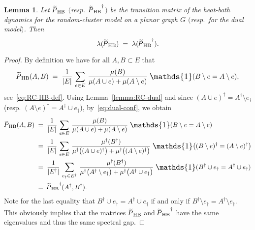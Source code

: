 \documentclass{dis}
\newtheorem{lemma}[theorem]{Lemma}
\theoremstyle{citing}
\begin{document}
\begin{lemma} \label{lemma:RC-HB-dual}
Let ${{\raisebox{2pt}{ ${\widetilde{{}}}$ }\mkern-14mu P}_{\rm HB}}$ $($resp.~${{\raisebox{2pt}{ ${\widetilde{{}}}$ }\mkern-14mu P}_{\rm HB}}^\dag$$)$ be the transition matrix of the 
heat-bath dynamics for the random-cluster model 
on a planar graph $G$ $($resp.~for the dual model\/$)$.
Then
\[
\lambda({{\raisebox{2pt}{ ${\widetilde{{}}}$ }\mkern-14mu P}_{\rm HB}}) \;=\; \lambda({{\raisebox{2pt}{ ${\widetilde{{}}}$ }\mkern-14mu P}_{\rm HB}}^\dag).
\]
\end{lemma}
\vspace{2mm}

\begin{proof}
By definition we have for all $A,B\subset E$ that 
\[
{{\raisebox{2pt}{ ${\widetilde{{}}}$ }\mkern-14mu P}_{\rm HB}}(A,B) \;=\; \frac1{{\left\vert {E} \right\vert}}\,\sum_{e\in E}\,
\frac{\mu(B)}{\mu(A\cup e)+\mu(A\setminus e)}\;
{\scalebox{1.2}{\raisebox{-0.2mm}{$\mathds{1}$}}}(B\setminus e = A\setminus e),
\]
see~\eqref{eq:RC-HB-def}. 
Using Lemma~\ref{lemma:RC-dual} and since 
$(A\cup e)^\dag=A^\dag\setminus e_\dag$ 
(resp. $(A\setminus e)^\dag=A^\dag\cup e_\dag$), 
by~\eqref{eq:dual-conf}, we obtain 
\[\begin{split}
{{\raisebox{2pt}{ ${\widetilde{{}}}$ }\mkern-14mu P}_{\rm HB}}(A,B) \;&=\; \frac1{{\left\vert {E} \right\vert}}\,\sum_{e\in E}\,
	\frac{\mu(B)}{\mu(A\cup e)+\mu(A\setminus e)}\;
	{\scalebox{1.2}{\raisebox{-0.2mm}{$\mathds{1}$}}}(B\setminus e = A\setminus e) \\
&=\; \frac1{{\left\vert {E} \right\vert}}\,\sum_{e\in E}\,
	\frac{\mu^\dag(B^\dag)}{\mu^\dag\bigl((A\cup e)^\dag\bigr)+
	\mu^\dag\bigl((A\setminus e)^\dag\bigr)}\;
	{\scalebox{1.2}{\raisebox{-0.2mm}{$\mathds{1}$}}}\bigl( (B\setminus e)^\dag = (A\setminus e)^\dag \bigr) \\
&=\; \frac1{{\left\vert {E^\dag} \right\vert}}\,\sum_{e_\dag\in E^\dag}\,
	\frac{\mu^\dag(B^\dag)}{\mu^\dag\bigl(A^\dag\setminus e_\dag\bigr)+
	\mu^\dag\bigl(A^\dag\cup e_\dag\bigr)}\;
	{\scalebox{1.2}{\raisebox{-0.2mm}{$\mathds{1}$}}}(B^\dag\cup e_\dag = A^\dag\cup e_\dag) \\
&=\; {{\raisebox{2pt}{ ${\widetilde{{}}}$ }\mkern-14mu P}_{\rm HB}}^\dag(A^\dag,B^\dag).
\end{split}\]
Note for the last equality that $B^\dag\cup e_\dag = A^\dag\cup e_\dag$ 
if and only if $B^\dag\setminus e_\dag = A^\dag\setminus e_\dag$. 
This obviously implies that the matrices ${{\raisebox{2pt}{ ${\widetilde{{}}}$ }\mkern-14mu P}_{\rm HB}}$ and ${{\raisebox{2pt}{ ${\widetilde{{}}}$ }\mkern-14mu P}_{\rm HB}}^\dag$ have 
the same eigenvalues and thus the same spectral gap.
\end{proof}
\vspace{2mm}
\end{document}
